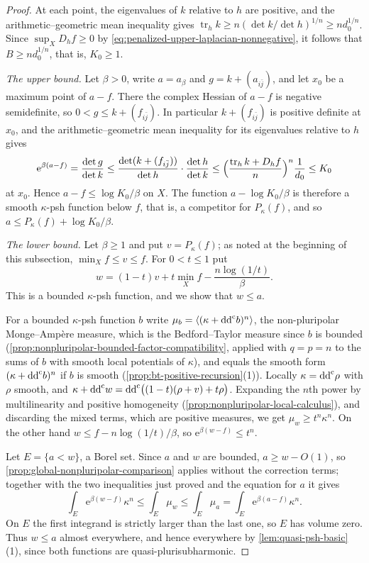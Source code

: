 \begin{proof}
At each point, the eigenvalues of $k$ relative to $h$ are positive, and the arithmetic--geometric mean inequality gives $\operatorname{tr}_hk\geq n(\det k/\det h)^{1/n}\geq nd_0^{1/n}$. Since $\sup_XD_hf\geq0$ by \eqref{eq:penalized-upper-laplacian-nonnegative}, it follows that $B\geq nd_0^{1/n}$, that is, $K_0\geq1$.

\emph{The upper bound.} Let $\beta>0$, write $a=a_\beta$ and $g=k+(a_{i\bar j})$, and let $x_0$ be a maximum point of $a-f$. There the complex Hessian of $a-f$ is negative semidefinite, so $0<g\leq k+(f_{i\bar j})$. In particular $k+(f_{i\bar j})$ is positive definite at $x_0$, and the arithmetic--geometric mean inequality for its eigenvalues relative to $h$ gives
\[
 \mathrm e^{\beta(a-f)}=\frac{\det g}{\det k}
 \leq\frac{\det(k+(f_{i\bar j}))}{\det h}\cdot\frac{\det h}{\det k}
 \leq\Bigl(\frac{\operatorname{tr}_hk+D_hf}{n}\Bigr)^n\frac1{d_0}
 \leq K_0
\]
at $x_0$. Hence $a-f\leq\log K_0/\beta$ on $X$. The function $a-\log K_0/\beta$ is therefore a smooth $\kappa$-psh function below $f$, that is, a competitor for $P_\kappa(f)$, and so $a\leq P_\kappa(f)+\log K_0/\beta$.

\emph{The lower bound.} Let $\beta\geq1$ and put $v=P_\kappa(f)$; as noted at the beginning of this subsection, $\min_Xf\leq v\leq f$. For $0<t\leq1$ put
\[
 w=(1-t)v+t\min_Xf-\frac{n\log(1/t)}{\beta}.
\]
This is a bounded $\kappa$-psh function, and we show that $w\leq a$.

For a bounded $\kappa$-psh function $b$ write $\mu_b=\langle(\kappa+\mathrm{dd}^{\mathrm{c}} b)^n\rangle$, the non-pluripolar Monge--Amp\`ere measure, which is the Bedford--Taylor measure since $b$ is bounded (\cref{prop:nonpluripolar-bounded-factor-compatibility}, applied with $q=p=n$ to the sums of $b$ with smooth local potentials of $\kappa$), and equals the smooth form $(\kappa+\mathrm{dd}^{\mathrm{c}} b)^n$ if $b$ is smooth (\cref{prop:bt-positive-recursion}(1)). Locally $\kappa=\mathrm{dd}^{\mathrm{c}}\rho$ with $\rho$ smooth, and $\kappa+\mathrm{dd}^{\mathrm{c}} w=\mathrm{dd}^{\mathrm{c}}\bigl((1-t)(\rho+v)+t\rho\bigr)$. Expanding the $n$th power by multilinearity and positive homogeneity (\cref{prop:nonpluripolar-local-calculus}), and discarding the mixed terms, which are positive measures, we get $\mu_w\geq t^n\kappa^n$. On the other hand $w\leq f-n\log(1/t)/\beta$, so $\mathrm e^{\beta(w-f)}\leq t^n$.

Let $E=\{a<w\}$, a Borel set. Since $a$ and $w$ are bounded, $a\geq w-O(1)$, so \cref{prop:global-nonpluripolar-comparison} applies without the correction terms; together with the two inequalities just proved and the equation for $a$ it gives
\[
 \int_E\mathrm e^{\beta(w-f)}\kappa^n
 \leq\int_E\mu_w
 \leq\int_E\mu_a
 =\int_E\mathrm e^{\beta(a-f)}\kappa^n.
\]
On $E$ the first integrand is strictly larger than the last one, so $E$ has volume zero. Thus $w\leq a$ almost everywhere, and hence everywhere by \cref{lem:quasi-psh-basic}(1), since both functions are quasi-plurisubharmonic.


\end{proof}
